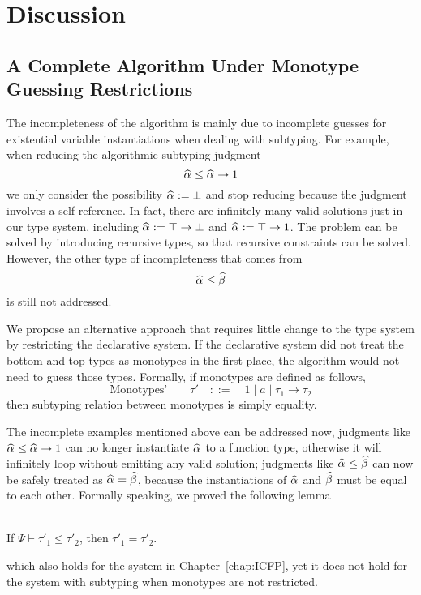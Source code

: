 
\section{Discussion}


\subsection{A Complete Algorithm Under Monotype Guessing Restrictions}

The incompleteness of the algorithm is mainly due to incomplete guesses
for existential variable instantiations when dealing with subtyping.
For example, when reducing the algorithmic subtyping judgment
$$\al \le \al \to 1$$
we only consider the possibility $\al := \bot$
and stop reducing because the judgment involves a self-reference.
In fact, there are infinitely many valid solutions just in our type system,
including $\al := \top \to \bot$ and $\al := \top \to 1$.
The problem can be solved by introducing recursive types,
so that recursive constraints can be solved.
However, the other type of incompleteness that comes from
$$\al \le \bt$$
is still not addressed.

We propose an alternative approach that requires little change to the type system
by restricting the declarative system.
If the declarative system did not treat the bottom and top types
as monotypes in the first place,
the algorithm would not need to guess those types.
Formally, if monotypes are defined as follows,
$$\text{Monotypes'}\qquad \tau' \quad  ::= \quad 1 \mid a \mid \tau_1\to \tau_2$$
then subtyping relation between monotypes is simply equality.

The incomplete examples mentioned above can be addressed now,
judgments like $\al \le \al \to 1$ can no longer instantiate $\al$ to a function type,
otherwise it will infinitely loop without emitting any valid solution;
judgments like $\al \le \bt$ can now be safely treated as $\al = \bt$,
because the instantiations of $\al$ and $\bt$ must be equal to each other.
Formally speaking, we proved the following lemma
\begin{lemma}~\\
    If $\Psi \vdash \tau'_1 \le \tau'_2$, then $\tau'_1 = \tau'_2$.
\end{lemma}
which also holds for the system in Chapter~\ref{chap:ICFP},
yet it does not hold for the system with subtyping when monotypes are not restricted.

